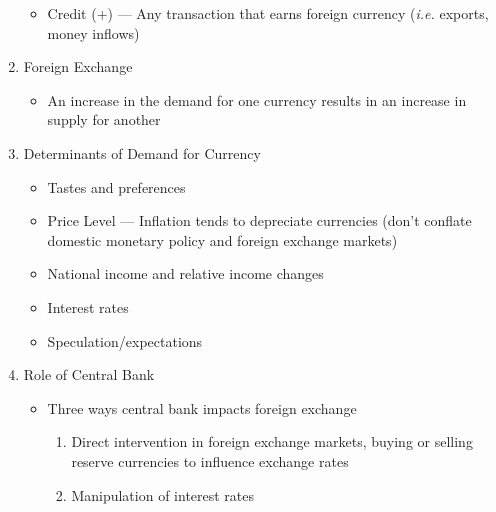 \documentclass[12pt]{article}
\begin{document}
\begin{enumerate}
\begin{itemize}
      \item Credit (+) — Any transaction that earns foreign currency (\textit{i.e.} exports, money inflows)

    \end{itemize}

  \item Foreign Exchange

    \begin{itemize}

      \item An increase in the demand for one currency results in an increase in supply for another

    \end{itemize}

  \item Determinants of Demand for Currency

    \begin{itemize}

      \item Tastes and preferences

      \item Price Level — Inflation tends to depreciate currencies (don't conflate domestic monetary policy and foreign exchange markets)

      \item National income and relative income changes

      \item Interest rates

      \item Speculation/expectations

    \end{itemize}

    \item Role of Central Bank

      \begin{itemize}

          \item Three ways central bank impacts foreign exchange

            \begin{enumerate}

                \item Direct intervention in foreign exchange markets, buying or selling reserve currencies to influence exchange rates

                \item Manipulation of interest rates


\end{enumerate}
\end{itemize}
\end{enumerate}
\end{document}
